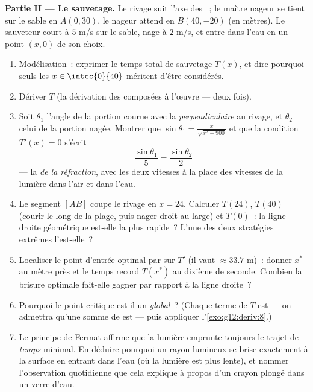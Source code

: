\begin{problem}
\medskip
\noindent\textbf{Partie II --- Le sauvetage.}
Le rivage suit l'axe des ~; le maître nageur se tient sur
le sable en $A(0, 30)$, le nageur attend en $B(40, -20)$ (en
mètres). Le sauveteur court à $5$ m/s sur le sable, nage à $2$ m/s,
et entre dans l'eau en un point $(x, 0)$ de son choix.
\begin{enumerate}[resume]
  \item Modélisation~: exprimer le temps total de sauvetage $T(x)$,
        et dire pourquoi seuls les $x \in \intcc{0}{40}$ méritent
        d'être considérés.
  \item Dériver $T$ (la dérivation des composées à l'œuvre --- deux
        fois).
  \item Soit $\theta_1$ l'angle de la portion courue avec la
        \emph{perpendiculaire} au rivage, et $\theta_2$ celui de la
        portion nagée. Montrer que
        $\sin\theta_1 = \frac{x}{\sqrt{x^2 + 900}}$ et que la
        condition $T'(x) = 0$ s'écrit
        \[
        \frac{\sin\theta_1}{5} = \frac{\sin\theta_2}{2}
        \]
        --- la \emph{ de la réfraction}, avec les deux vitesses à
        la place des vitesses de la lumière dans l'air et dans
        l'eau.
  \item Le segment $[AB]$ coupe le rivage en $x = 24$. Calculer
        $T(24)$, $T(40)$ (courir le long de la plage, puis nager
        droit au large) et $T(0)$~: la ligne droite géométrique
        est-elle la plus rapide~? L'une des deux stratégies
        extrêmes l'est-elle~?
  \item Localiser le point d'entrée optimal par  sur $T'$
        (il vaut $\approx 33.7$ m)~: donner $x^*$ au mètre près et
        le temps record $T(x^*)$ au dixième de seconde. Combien la
        brisure optimale fait-elle gagner par rapport à la ligne
        droite~?
  \item Pourquoi le point critique est-il un  \emph{global}~?
        (Chaque terme de $T$ est  --- on admettra qu'une
        somme de   est  --- puis appliquer
        l'\cref{exo:g12:deriv:8}.)
  \item Le principe de Fermat affirme que la lumière emprunte
        toujours le trajet de \emph{temps} minimal. En déduire
        pourquoi un rayon lumineux se brise exactement à la surface
        en entrant dans l'eau (où la lumière est plus lente), et
        nommer l'observation quotidienne que cela explique à propos
        d'un crayon plongé dans un verre d'eau.
\end{enumerate}


\end{problem}
